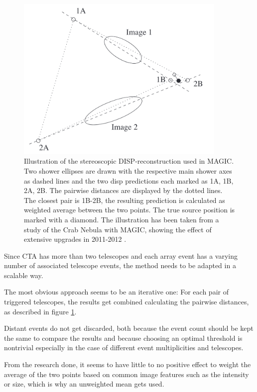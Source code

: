 \begin{figure}
    \centering
    \captionsetup{width=0.9\linewidth}
    \includegraphics[width=0.9\textwidth]{images/magic_stereo_disp.png}
    \caption{Illustration of the stereoscopic DISP-reconstruction used in MAGIC.
        Two shower ellipses are drawn with the respective main shower axes as dashed lines
        and the two disp predictions each marked as 1A, 1B, 2A, 2B.
        The pairwise distances are displayed by the dotted lines.
        The closest pair is 1B-2B, the resulting prediction is calculated as 
        weighted average between the two points. The true source position is marked with a diamond.
        The illustration has been taken from a study of the Crab Nebula with MAGIC,
        showing the effect of extensive upgrades in 2011-2012 \cite{ALEKSIC201676}.}
    \label{fig:disp_magic}
\end{figure}


Since CTA has more than two telescopes and each array event has a varying number
of associated telescope events, the method needs to be adapted in a scalable way.

The most obvious approach seems to be an iterative one:
For each pair of triggered telescopes, the results get combined
calculating the pairwise distances, as described in figure \ref{fig:disp_magic}. 

Distant events do not get discarded, both because the event count should be kept the same
to compare the results and because choosing an optimal threshold 
is nontrivial especially in the case of different event multiplicities and
telescopes.

From the research done, it seems to have little to no positive effect to weight
the average of the two points based on common image features such as 
the intensity or size, which is why an unweighted mean gets used.

